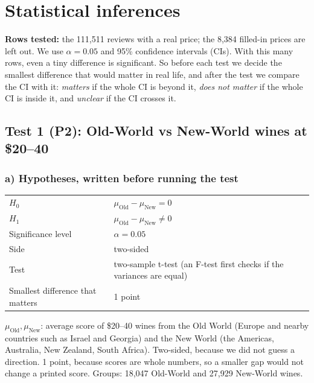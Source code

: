 \documentclass[10pt,a4paper,twocolumn]{article}
\newif\ifshowhints
\newcommand{\hint}[1]{\ifshowhints\par{\color{gray}\itshape\small #1\par}\fi}
\begin{document}
\section{Statistical inferences}
\hint{Conduct 3--5 hypothesis tests on your problem statement(s), each with parts a)--c) below. Know your tests and the
reason for using them, and compare them with other tests.}

\textbf{Rows tested:} the 111,511 reviews with a real price; the 8,384 filled-in prices are left out. We use
$\alpha = 0.05$ and 95\% confidence intervals (CIs). With this many rows, even a tiny difference is significant. So
before each test we decide the smallest difference that would matter in real life, and after the test we compare the CI
with it: \emph{matters} if the whole CI is beyond it, \emph{does not matter} if the whole CI is inside it, and
\emph{unclear} if the CI crosses it.

\subsection*{Test 1 (P2): Old-World vs New-World wines at \$20--40}

\subsubsection*{a) Hypotheses, written before running the test}
\hint{Before running the test, write the null and alternative hypotheses ($H_0$ carries the equality), the
significance level, one- or two-sided, the test you will use, and the smallest difference that would matter in the
real world.}
{\small
\begin{tabularx}{\columnwidth}{@{}HL@{}}
\toprule
$H_0$ & $\mu_{\text{Old}} - \mu_{\text{New}} = 0$\\
$H_1$ & $\mu_{\text{Old}} - \mu_{\text{New}} \neq 0$\\
Significance level & $\alpha = 0.05$\\
Side & two-sided\\
Test & two-sample t-test (an F-test first checks if the variances are equal)\\
Smallest difference that matters & 1 point\\
\bottomrule
\end{tabularx}\par}

$\mu_{\text{Old}}, \mu_{\text{New}}$: average score of \$20--40 wines from the Old World (Europe and nearby countries
such as Israel and Georgia) and the New World (the Americas, Australia, New Zealand, South Africa). Two-sided, because
we did not guess a direction. 1 point, because scores are whole numbers, so a smaller gap would not change a printed
score. Groups: 18,047 Old-World and 27,929 New-World wines.
\end{document}
